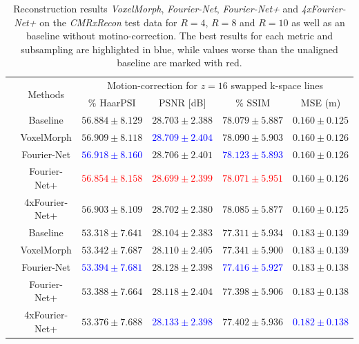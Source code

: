 \begin{table}[h] %
	\footnotesize
	\centering
	\caption{Reconstruction results \emph{VoxelMorph}, \emph{Fourier-Net}, \emph{Fourier-Net+} and \emph{4xFourier-Net+} on the \emph{CMRxRecon} test data for $R=4$, $R=8$ and $R=10$ as well as an baseline without motino-correction. The best results for each metric and subsampling are highlighted in blue, while values worse than the unaligned baseline are marked with red.}
	\label{tab:ComparisonReconstructionCMRxRecon}
	\begin{tabular}{c c c c c c} 
		\toprule
		 & \multirow{2}{*}{Methods} & \multicolumn{4}{c}{Motion-correction for $z=16$ swapped k-space lines} \\
		\cmidrule(lr){3-6} 
		 & & $\%$ HaarPSI & PSNR [dB] & $\%$ SSIM & MSE (m)\\
		
		\midrule
		\multirow{5}{*}{\rotatebox{90}{$R=4$}} & Baseline & $56.884 \pm 8.129$ & $28.703 \pm 2.388$ & $78.079 \pm 5.887$ & $0.160 \pm 0.125$ \\  
		 & VoxelMorph & $56.909 \pm 8.118$ & \textcolor{blue}{$28.709 \pm 2.404$} & $78.090 \pm 5.903$ & $0.160 \pm 0.126$ \\  
		 & Fourier-Net & \textcolor{blue}{$56.918 \pm 8.160$} & $28.706 \pm 2.401$ & \textcolor{blue}{$78.123 \pm 5.893$} & $0.160 \pm 0.126$ \\  
		 & Fourier-Net+ & \textcolor{red}{$56.854 \pm 8.158$} & \textcolor{red}{$28.699 \pm 2.399$} & \textcolor{red}{$78.071 \pm 5.951$} & $0.160 \pm 0.126$ \\   
		 & 4xFourier-Net+ & $56.903 \pm 8.109$ & $28.702 \pm 2.380$ & $78.085 \pm 5.877$ & $0.160 \pm 0.125$ \\  
		
		\midrule
		\multirow{5}{*}{\rotatebox{90}{$R=8$}} & Baseline & $53.318 \pm 7.641$ & $28.104 \pm 2.383$ & $77.311 \pm 5.934$ & $0.183 \pm 0.139$ \\  
		 & VoxelMorph & $53.342 \pm 7.687$ & $28.110 \pm 2.405$ & $77.341 \pm 5.900$ & $0.183 \pm 0.139$ \\  
		 & Fourier-Net & \textcolor{blue}{$53.394 \pm 7.681$} & $28.128 \pm 2.398$ & \textcolor{blue}{$77.416 \pm 5.927$} & $0.183 \pm 0.138$ \\  
		 & Fourier-Net+ & $53.388 \pm 7.664$ & $28.118 \pm 2.404$ & $77.398 \pm 5.906$ & $0.183 \pm 0.138$ \\   
		 & 4xFourier-Net+ & $53.376 \pm 7.688$ & \textcolor{blue}{$28.133 \pm 2.398$} & $77.402 \pm 5.936$ & \textcolor{blue}{$0.182 \pm 0.138$} \\ 
		 	 

\end{tabular}
\end{table}
